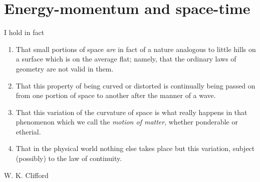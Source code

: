 \documentclass[a4paper,12pt,%
onecolumn,oneside,%
british%
]{memoir}
\newcommand*{\amp}{\&}
\renewcommand*{\|}[1][]{\nonscript\:#1\vert\nonscript\:\mathopen{}}
\begin{document}
%
%
%
%





\printpagenotes*
\clearpage
\chapter{Energy-momentum and space-time}
\label{cha:energymomentum}

\epigraph{%
I hold in fact
 \begin{enumerate}[label=(\arabic*),wide,nosep,itemindent=2em]
 \item That small portions of space \emph{are} in fact of a nature analogous to little hills on a surface which is on the average flat; namely, that the ordinary laws of geometry are not valid in them.
 \item That this property of being curved or distorted is continually being passed on from one portion of space to another after the manner of a wave.
 \item That this variation of the curvature of space is what really happens in that phenomenon which we call the \emph{motion of matter}, whether ponderable or etherial.
 \item That in the physical world nothing else takes place but this variation, subject (possibly) to the law of continuity.
 \end{enumerate}
}{W. K. Clifford \cites*{clifford1876}}
\end{document}
